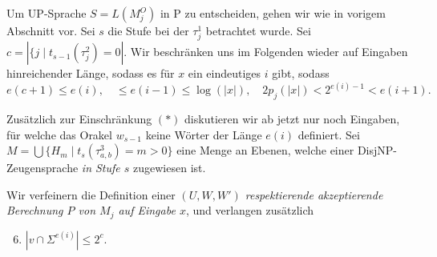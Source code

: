 \documentclass[nofonts]{uebung}
\def\P{\ensuremath{\mathrm{P}}}
\def\UP{\ensuremath{\mathrm{UP}}}
\begin{document}
Um $\UP$-Sprache $S=L(M_j^O)$ in $\P$ zu entscheiden, gehen wir wie in vorigem Abschnitt vor.
Sei $s$ die Stufe bei der $\tau^1_j$ betrachtet wurde.
Sei $c=|\{j\mid t_{s-1}(\tau^2_j)=0|$.
Wir beschränken uns im Folgenden wieder auf Eingaben hinreichender Länge, sodass es für $x$ ein eindeutiges $i$ gibt, sodass
\[ e(c+1)\leq e(i), \quad \leq e(i-1) \leq \log(|x|), \quad 2p_j(|x|)< 2^{e(i)-1} < e(i+1).\tag{\ast} \]

Zusätzlich zur Einschränkung $(\ast)$ diskutieren wir ab jetzt nur noch Eingaben, für welche das Orakel $w_{s-1}$ keine Wörter der Länge $e(i)$ definiert.
Sei $M=\bigcup \{ H_m \mid t_s(\tau^3_{a,b})=m>0 \}$ eine Menge an Ebenen, welche einer DisjNP-Zeugensprache \emph{in Stufe $s$} zugewiesen ist.

Wir verfeinern die Definition einer \emph{$(U, W, W')$ respektierende akzeptierende Berechnung $P$ von $M_j$ auf Eingabe $x$}, und verlangen zusätzlich
\begin{enumerate}[label={\arabic*.},nosep]
    \setcounter{enumi}{5}
    \item $|v\cap \Sigma^{e(i)}|\leq 2^{c}$.
\end{enumerate}
\end{document}
